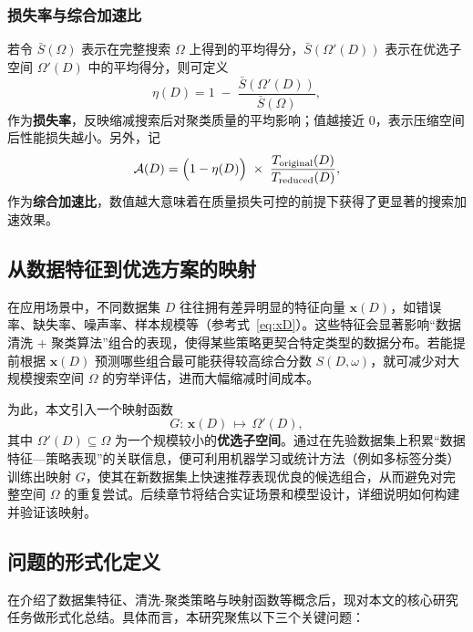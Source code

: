 \documentclass[8pt]{article} %
\numberwithin{equation}{section}
\begin{document}
\subsubsection*{损失率与综合加速比}
若令 \(\bar{S}(\Omega)\) 表示在完整搜索 \(\Omega\) 上得到的平均得分，\(\bar{S}(\Omega'(D))\) 表示在优选子空间 \(\Omega'(D)\) 中的平均得分，则可定义
\begin{equation}\label{eq:loss-rate}
  \eta(D)
  =
  1 \;-\;
  \frac{\bar{S}(\Omega'(D))}{\bar{S}(\Omega)},
\end{equation}
作为\textbf{损失率}，反映缩减搜索后对聚类质量的平均影响；值越接近 0，表示压缩空间后性能损失越小。另外，记
\begin{equation}\label{eq:acc-ratio}
  \mathcal{A}(D)
  =
  \Bigl(1 - \eta(D)\Bigr)
  \;\times\;
  \frac{T_{\text{original}}(D)}{T_{\text{reduced}}(D)},
\end{equation}
作为\textbf{综合加速比}，数值越大意味着在质量损失可控的前提下获得了更显著的搜索加速效果。

\subsection{从数据特征到优选方案的映射}
\label{subsec:mapping-model}

在应用场景中，不同数据集 \(D\) 往往拥有差异明显的特征向量 \(\mathbf{x}(D)\)，如错误率、缺失率、噪声率、样本规模等（参考式~\eqref{eq:xD}）。这些特征会显著影响“数据清洗 + 聚类算法”组合的表现，使得某些策略更契合特定类型的数据分布。若能提前根据 \(\mathbf{x}(D)\) 预测哪些组合最可能获得较高综合分数 \(S(D,\omega)\)，就可减少对大规模搜索空间 \(\Omega\) 的穷举评估，进而大幅缩减时间成本。

为此，本文引入一个映射函数
\begin{equation}\label{eq:Omega-prime}
  G:\, \mathbf{x}(D)\,\mapsto\, \Omega'(D),
\end{equation}
其中 \(\Omega'(D)\subseteq \Omega\) 为一个规模较小的\textbf{优选子空间}。通过在先验数据集上积累“数据特征—策略表现”的关联信息，便可利用机器学习或统计方法（例如多标签分类）训练出映射 \(G\)，使其在新数据集上快速推荐表现优良的候选组合，从而避免对完整空间 \(\Omega\) 的重复尝试。后续章节将结合实证场景和模型设计，详细说明如何构建并验证该映射。

\subsection{问题的形式化定义}
\label{subsec:problem-formalization}

在介绍了数据集特征、清洗-聚类策略与映射函数等概念后，现对本文的核心研究任务做形式化总结。具体而言，本研究聚焦以下三个关键问题：
\end{document}
